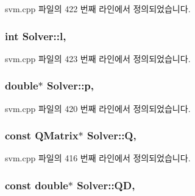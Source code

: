 svm.\+cpp 파일의 422 번째 라인에서 정의되었습니다.

\hypertarget{class_solver_a88832d45b6de977b1cbb2afd4c0e494c}{
\subsubsection[{l}]{\setlength{\rightskip}{0pt plus 5cm}int Solver\+::l\hspace{0.3cm}{\ttfamily [protected]}, {\ttfamily [inherited]}}}\label{class_solver_a88832d45b6de977b1cbb2afd4c0e494c}


svm.\+cpp 파일의 423 번째 라인에서 정의되었습니다.

\hypertarget{class_solver_a882cce072f56679880d409e3e73f7ae8}{
\subsubsection[{p}]{\setlength{\rightskip}{0pt plus 5cm}double$\ast$ Solver\+::p\hspace{0.3cm}{\ttfamily [protected]}, {\ttfamily [inherited]}}}\label{class_solver_a882cce072f56679880d409e3e73f7ae8}


svm.\+cpp 파일의 420 번째 라인에서 정의되었습니다.

\hypertarget{class_solver_a2d3461718f0570bdc47f5dfb31d61e0a}{
\subsubsection[{Q}]{\setlength{\rightskip}{0pt plus 5cm}const {\bf Q\+Matrix}$\ast$ Solver\+::\+Q\hspace{0.3cm}{\ttfamily [protected]}, {\ttfamily [inherited]}}}\label{class_solver_a2d3461718f0570bdc47f5dfb31d61e0a}


svm.\+cpp 파일의 416 번째 라인에서 정의되었습니다.

\hypertarget{class_solver_a7c7b7b1207983543855165e8eb249f2a}{
\subsubsection[{Q\+D}]{\setlength{\rightskip}{0pt plus 5cm}const double$\ast$ Solver\+::\+Q\+D\hspace{0.3cm}{\ttfamily [protected]}, {\ttfamily [inherited]}}}\label{class_solver_a7c7b7b1207983543855165e8eb249f2a}


